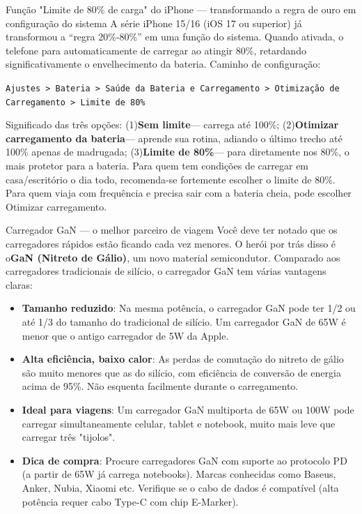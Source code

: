 \begin{tcbinfo}{Função "Limite de 80\% de carga" do iPhone — transformando a regra de ouro em configuração do sistema}
A série iPhone 15/16 (iOS 17 ou superior) já transformou a “regra 20\%-80\%” em uma função do sistema. Quando ativada, o telefone para automaticamente de carregar ao atingir 80\%, retardando significativamente o envelhecimento da bateria. Caminho de configuração:

\texttt{Ajustes > Bateria > Saúde da Bateria e Carregamento > Otimização de Carregamento > Limite de 80\%}

Significado das três opções: (1)\textbf{Sem limite}— carrega até 100\%; (2)\textbf{Otimizar carregamento da bateria}— aprende sua rotina, adiando o último trecho até 100\% apenas de madrugada; (3)\textbf{Limite de 80\%}— para diretamente nos 80\%, o mais protetor para a bateria. Para quem tem condições de carregar em casa/escritório o dia todo, recomenda-se fortemente escolher o limite de 80\%. Para quem viaja com frequência e precisa sair com a bateria cheia, pode escolher Otimizar carregamento.

\end{tcbinfo}

\begin{tcbinfo}{Carregador GaN — o melhor parceiro de viagem}
Você deve ter notado que os carregadores rápidos estão ficando cada vez menores. O herói por trás disso é o\textbf{GaN (Nitreto de Gálio)}, um novo material semicondutor. Comparado aos carregadores tradicionais de silício, o carregador GaN tem várias vantagens claras:

\begin{itemize}
  \item \textbf{Tamanho reduzido}: Na mesma potência, o carregador GaN pode ter 1/2 ou até 1/3 do tamanho do tradicional de silício. Um carregador GaN de 65W é menor que o antigo carregador de 5W da Apple.
  \item \textbf{Alta eficiência, baixo calor}: As perdas de comutação do nitreto de gálio são muito menores que as do silício, com eficiência de conversão de energia acima de 95\%. Não esquenta facilmente durante o carregamento.
  \item \textbf{Ideal para viagens}: Um carregador GaN multiporta de 65W ou 100W pode carregar simultaneamente celular, tablet e notebook, muito mais leve que carregar três "tijolos".
  \item \textbf{Dica de compra}: Procure carregadores GaN com suporte ao protocolo PD (a partir de 65W já carrega notebooks). Marcas conhecidas como Baseus, Anker, Nubia, Xiaomi etc. Verifique se o cabo de dados é compatível (alta potência requer cabo Type-C com chip E-Marker).
\end{itemize}

\end{tcbinfo}


